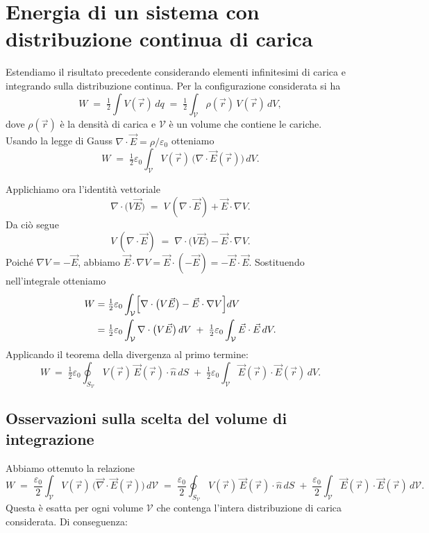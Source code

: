 \documentclass{book}
\begin{document}
\section{Energia di un sistema con distribuzione continua di carica}

Estendiamo il risultato precedente considerando elementi infinitesimi di carica e integrando sulla distribuzione continua. Per la configurazione considerata si ha
\[
W \;=\; \tfrac{1}{2}\int V(\vec r)\,dq
\;=\; \tfrac{1}{2}\int_{\mathcal V} \rho(\vec r)\,V(\vec r)\,dV,
\]
dove \(\rho(\vec r)\) è la densità di carica e \(\mathcal V\) è un volume che contiene le cariche. Usando la legge di Gauss \(\nabla\cdot\vec E=\rho/\varepsilon_0\) otteniamo
\[
W \;=\; \tfrac{1}{2}\varepsilon_0 \int_{\mathcal V} V(\vec r)\,\bigl(\nabla\cdot\vec E(\vec r)\bigr)\,dV.
\]

Applichiamo ora l'identità vettoriale
\[
\nabla\cdot\bigl(V\vec E\bigr) \;=\; V\,(\nabla\cdot\vec E) + \vec E\cdot\nabla V.
\]
Da ciò segue
\[
V\,(\nabla\cdot\vec E) \;=\; \nabla\cdot\bigl(V\vec E\bigr) - \vec E\cdot\nabla V.
\]
Poiché \(\nabla V = -\vec E\), abbiamo \(\vec E\cdot\nabla V = \vec E\cdot(-\vec E) = -\vec E\cdot\vec E\). Sostituendo nell'integrale otteniamo
\[
\begin{aligned}
W
&= \tfrac{1}{2}\varepsilon_0 \int_{\mathcal V} \Bigl[ \nabla\cdot\bigl(V\vec E\bigr) - \vec E\cdot\nabla V \Bigr] dV \\
&= \tfrac{1}{2}\varepsilon_0 \int_{\mathcal V} \nabla\cdot\bigl(V\vec E\bigr)\,dV \;+\; \tfrac{1}{2}\varepsilon_0 \int_{\mathcal V} \vec E\cdot\vec E\,dV.
\end{aligned}
\]
Applicando il teorema della divergenza al primo termine:
\[
W \;=\; \tfrac{1}{2}\varepsilon_0 \oint_{S_{\mathcal V}} V(\vec r)\,\vec E(\vec r)\cdot\hat n\,dS
\;+\; \tfrac{1}{2}\varepsilon_0 \int_{\mathcal V} \vec E(\vec r)\cdot\vec E(\vec r)\,dV.
\]



\subsection*{Osservazioni sulla scelta del volume di integrazione}

Abbiamo ottenuto la relazione
\[
W \;=\; \frac{\varepsilon_0}{2}\int_{\mathcal V} V(\vec r)\,\bigl(\vec{\nabla}\cdot\vec E(\vec r)\bigr)\,d\mathcal V
\;=\; \frac{\varepsilon_0}{2}\oint_{S_{\mathcal V}} V(\vec r)\,\vec E(\vec r)\cdot\hat n\,dS
\;+\; \frac{\varepsilon_0}{2}\int_{\mathcal V} \vec E(\vec r)\cdot\vec E(\vec r)\,d\mathcal V.
\]
Questa è esatta per ogni volume \(\mathcal V\) che contenga l'intera distribuzione di carica considerata. Di conseguenza:
\end{document}
